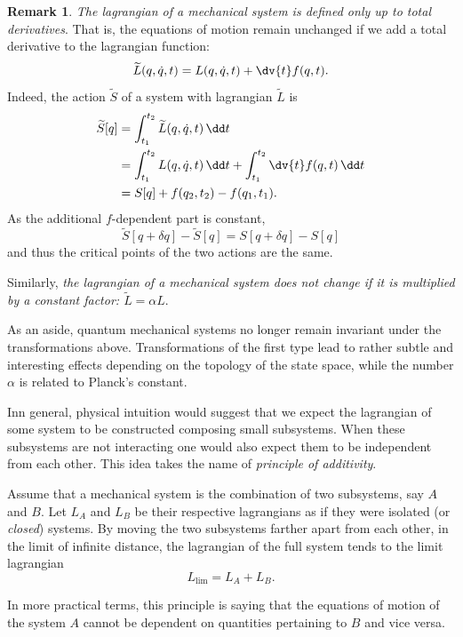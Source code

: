 \documentclass[english,fontsize=11pt,paper=b5]{scrbook}
\numberwithin{equation}{chapter}
\theoremstyle{definition}
\newtheorem{remark}{Remark}[chapter]
\newcommand{\emphidx}[1]{\index{#1}\emph{#1}}
\begin{document}
    \begin{remark}\label{rmk:manylagrangians}
      \emph{The lagrangian of a mechanical system is defined only up to total derivatives}.
      That is, the equations of motion remain unchanged if we add a total derivative to the lagrangian function:
      \begin{equation}
        \widetilde L(q,\dot q, t) = L(q, \dot q, t) + \dv{t} f(q,t).
      \end{equation}
      Indeed, the action $\widetilde S$ of a system with lagrangian $\widetilde L$ is
      \begin{align}
        \widetilde S[q] & = \int_{t_1}^{t_2} \widetilde L(q, \dot q, t) \,\dd t                                       \\
                        & = \int_{t_1}^{t_2} L(q, \dot q, t) \,\dd t + \int_{t_1}^{t_2} \dv{t} f(q,t) \,\dd t \\
                        & = S[q] + f(q_2, t_2) - f(q_1, t_1).
      \end{align}
      As the additional $f$-dependent part is constant,
      \begin{equation}
        \widetilde S[q+\delta q] - \widetilde S[q]
        = S[q+\delta q] - S[q]
      \end{equation}
      and thus the critical points of the two actions are the same.

      Similarly, \emph{the lagrangian of a mechanical system does not change if it is multiplied by a constant factor: $\widetilde L = \alpha L$}.

      As an aside, quantum mechanical systems no longer remain invariant under the transformations above. Transformations of the first type lead to rather subtle and interesting effects depending on the topology of the state space, while the number $\alpha$ is related to Planck's constant.
    \end{remark}

    Inn general, physical intuition would suggest that we expect the lagrangian of some system to be constructed composing small subsystems.
    When these subsystems are not interacting one would also expect them to be independent from each other.
    This idea takes the name of \emphidx{principle of additivity}.
    \begin{tcolorbox}[title=Principle of additivity]
      Assume that a mechanical system is the combination of two subsystems, say $A$ and $B$.
      Let $L_A$ and $L_B$ be their respective lagrangians as if they were isolated (or \emph{closed}) systems.
      By moving the two subsystems farther apart from each other, in the limit of infinite distance, the lagrangian of the full system tends to the limit lagrangian
      \begin{equation}
        L_{\lim} = L_A + L_B.
      \end{equation}
    \end{tcolorbox}
    In more practical terms, this principle is saying that the equations of motion of the system $A$ cannot be dependent on quantities pertaining to $B$ and vice versa.
\end{document}

